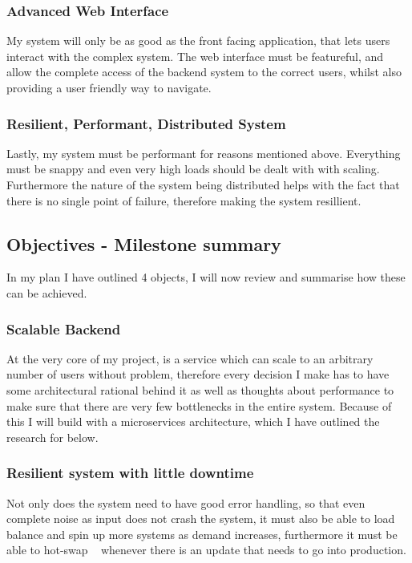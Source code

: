 \documentclass[titlepage]{article}
\begin{document}
\subsubsection{Advanced Web Interface}
My system will only be as good as the front facing application, that lets users interact with the complex system. The web interface must be featureful, and allow the complete access of the backend system to the correct users, whilst also providing a user friendly way to navigate.

\subsubsection{Resilient, Performant, Distributed System}
Lastly, my system must be performant for reasons mentioned above. Everything must be snappy and even very high loads should be dealt with with scaling. Furthermore the nature of the system being distributed helps with the fact that there is no single point of failure, therefore making the system resillient.

\subsection{Objectives - Milestone summary}

In my plan I have outlined 4 objects, I will now review and summarise how these can be achieved.

\subsubsection{Scalable Backend}
At the very core of my project, is a service which can scale to an arbitrary number of users without problem, therefore every decision I make has to have some architectural rational behind it as well as thoughts about performance to make sure that there are very few bottlenecks in the entire system. Because of this I will build with a microservices architecture, which I have outlined the research for below.

\subsubsection{Resilient system with little downtime}
Not only does the system need to have good error handling, so that even complete noise as input does not crash the system, it must also be able to load balance and spin up more systems as demand increases, furthermore it must be able to hot-swap ~\cite{hot_swap} whenever there is an update that needs to go into production. 
\end{document}
